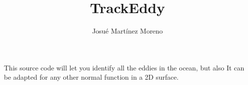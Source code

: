 \documentclass[paper=a4, fontsize=12pt]{article}
\title{TrackEddy}
\author{Josu\'e Mart\'inez Moreno }
\begin{document}
	\maketitle
    This source code will let you identify all the eddies in the ocean, but also It can be adapted for any other normal function in a 2D surface.
\end{document}
